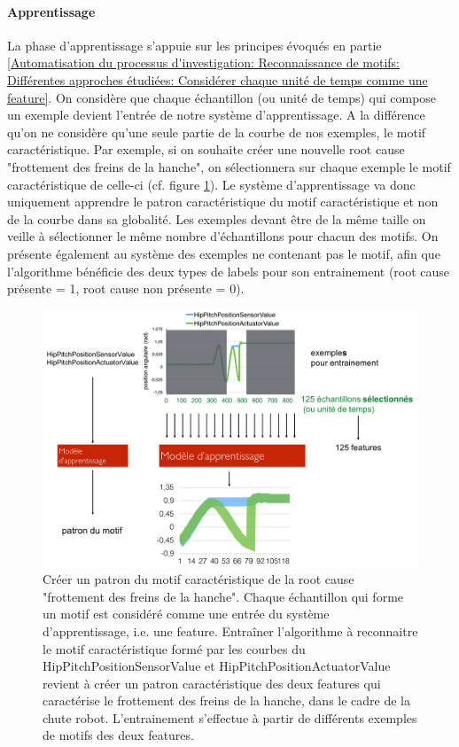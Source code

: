 \paragraph{Apprentissage} La phase d'apprentissage s'appuie sur les principes évoqués en partie \ref{Automatisation du processus d'investigation: Reconnaissance de motifs: Différentes approches étudiées: Considérer chaque unité de temps comme une feature}. On considère que chaque échantillon (ou unité de temps) qui compose un exemple devient l'entrée de notre système d'apprentissage. A la différence qu'on ne considère qu'une seule partie de la courbe de nos exemples, le motif caractéristique. Par exemple, si on souhaite créer une nouvelle root cause "frottement des freins de la hanche", on sélectionnera sur chaque exemple le motif caractéristique de celle-ci (cf. figure \ref{fig:Créer un patron du motif caractéristique de la root cause "frottement des freins de la hanche"}). Le système d'apprentissage va donc uniquement apprendre le patron caractéristique du motif caractéristique et non de la courbe dans sa globalité. Les exemples devant être de la même taille on veille à sélectionner le même nombre d'échantillons pour chacun des motifs. On présente également au système des exemples ne contenant pas le motif, afin que l'algorithme bénéficie des deux types de labels pour son entrainement (root cause présente = 1, root cause non présente = 0).

\begin{figure}[h]
	\centering\includegraphics[width=14cm]{images/patron_motif.png}
	\caption[Créer un patron du motif caractéristique de la root cause "frottement des freins de la hanche"]{Créer un patron du motif caractéristique de la root cause "frottement des freins de la hanche". Chaque échantillon qui forme un motif est considéré comme une entrée du système d'apprentissage, i.e. une feature. Entraîner l'algorithme à reconnaitre le motif caractéristique formé par les courbes du HipPitchPositionSensorValue et HipPitchPositionActuatorValue revient à créer un patron caractéristique des deux features qui caractérise le frottement des freins de la hanche, dans le cadre de la chute robot. L'entrainement s'effectue à partir de différents exemples de motifs des deux features.}
	\label{fig:Créer un patron du motif caractéristique de la root cause "frottement des freins de la hanche"}
\end{figure}

